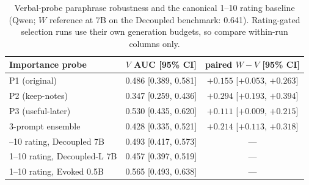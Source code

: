 \begin{table}[h]
\centering
\caption{Verbal-probe paraphrase robustness and the canonical 1--10 rating
baseline (Qwen; $W$ reference at 7B on the Decoupled benchmark: 0.641).
Rating-gated selection runs use their own generation budgets, so compare
within-run columns only.}
\label{tab:appA11}
\small
\begin{tabular}{lcc}
\toprule
Importance probe & $V$ AUC [95\% CI] & paired $W-V$ [95\% CI] \\
\midrule
P1 (original) & 0.486 [0.389, 0.581] & \textcolor{gain}{$+0.155$} [$+0.053$, $+0.263$] \\
P2 (keep-notes) & 0.347 [0.259, 0.436] & \textcolor{gain}{$+0.294$} [$+0.193$, $+0.394$] \\
P3 (useful-later) & 0.530 [0.435, 0.620] & \textcolor{gain}{$+0.111$} [$+0.009$, $+0.215$] \\
3-prompt ensemble & 0.428 [0.335, 0.521] & \textcolor{gain}{$+0.214$} [$+0.113$, $+0.318$] \\
\addlinespace
1--10 rating, Decoupled 7B & 0.493 [0.417, 0.573] & --- \\
1--10 rating, Decoupled-L 7B & 0.457 [0.397, 0.519] & --- \\
1--10 rating, Evoked 0.5B & 0.565 [0.493, 0.638] & --- \\
\bottomrule
\end{tabular}
\end{table}
